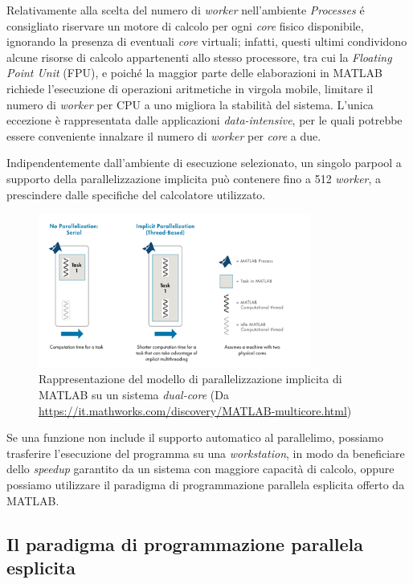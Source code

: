 Relativamente alla scelta del numero di \textit{worker} nell'ambiente \textit{Processes} \'e consigliato riservare un motore di calcolo per ogni \textit{core} 
fisico disponibile, ignorando la presenza di eventuali \textit{core} virtuali; infatti, questi ultimi condividono alcune risorse di calcolo appartenenti allo 
stesso processore, tra cui la \textit{Floating Point Unit} (FPU), e poich\'e la maggior parte delle elaborazioni in MATLAB richiede l'esecuzione di operazioni 
aritmetiche in virgola mobile, limitare il numero di \textit{worker} per CPU a uno migliora la stabilit\`a del sistema. \newline 
L'unica eccezione \`e rappresentata dalle applicazioni \textit{data-intensive}, per le quali potrebbe essere conveniente innalzare il numero di \textit{worker} per 
\textit{core} a due.

Indipendentemente dall'ambiente di esecuzione selezionato, un singolo parpool a supporto della parallelizzazione implicita pu\`o contenere fino a 512 \textit{worker}, a prescindere dalle specifiche 
del calcolatore utilizzato.
\begin{figure}[htbp]
    \centering
    \includegraphics[width=0.8\textwidth]{../Risorse/Capitolo 2/ImplicitParallelization.png}
    \caption{Rappresentazione del modello di parallelizzazione implicita di MATLAB su un sistema \textit{dual-core}
    \small{(Da \url{https://it.mathworks.com/discovery/MATLAB-multicore.html})}}
    \label{fig:ParallelismoImplicito}
\end{figure}\newline
Se una funzione non include il supporto automatico al parallelimo, possiamo trasferire l'esecuzione del programma su una \textit{workstation}, in modo da beneficiare 
dello \textit{speedup} garantito da un sistema con maggiore capacit\`a di calcolo, oppure possiamo utilizzare il paradigma di programmazione parallela esplicita offerto 
da MATLAB.

\subsection{Il paradigma di programmazione parallela esplicita}

